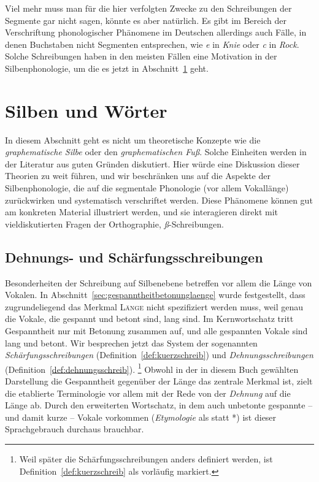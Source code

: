 Viel mehr muss man für die hier verfolgten Zwecke zu den Schreibungen der Segmente gar nicht sagen, könnte es aber natürlich.
Es gibt im Bereich der Verschriftung phonologischer Phänomene im Deutschen allerdings auch Fälle, in denen Buchstaben nicht Segmenten entsprechen, wie \textit{e} in \textit{Knie} oder \textit{c} in \textit{Rock}.
Solche Schreibungen haben in den meisten Fällen eine Motivation in der Silbenphonologie, um die es jetzt in Abschnitt~\ref{sec:silbenschreib} geht.

\section{Silben und Wörter}

\label{sec:silbenschreib}

In diesem Abschnitt geht es nicht um theoretische Konzepte wie die \textit{graphematische Silbe} oder den \textit{graphematischen Fuß}.
Solche Einheiten werden in der Literatur aus guten Gründen diskutiert.
Hier würde eine Diskussion dieser Theorien zu weit führen, und wir beschränken uns auf die Aspekte der Silbenphonologie, die auf die segmentale Phonologie (vor allem Vokallänge) zurückwirken und systematisch verschriftet werden.
Diese Phänomene können gut am konkreten Material illustriert werden, und sie interagieren direkt mit vieldiskutierten Fragen der Orthographie, \zB \textit{ß}-Schreibungen.

\subsection{Dehnungs- und Schärfungsschreibungen}

\label{sec:laengeschreib}

Besonderheiten der Schreibung auf Silbenebene betreffen vor allem die Länge von Vokalen.
In Abschnitt~\ref{sec:gespanntheitbetonunglaenge} wurde festgestellt, dass zugrundeliegend das Merkmal \textsc{Länge} nicht spezifiziert werden muss, weil genau die Vokale, die gespannt und betont sind, lang sind.
Im Kernwortschatz tritt Gespanntheit nur mit Betonung zusammen auf, und alle gespannten Vokale sind lang und betont.
Wir besprechen jetzt das System der sogenannten \textit{Schärfungsschreibungen} (Definition~\ref{def:kuerzschreib}) und \textit{Dehnungsschreibungen} (Definition~\ref{def:dehnungsschreib}).%
\footnote{Weil später die Schärfungsschreibungen anders definiert werden, ist Definition~\ref{def:kuerzschreib} als vorläufig markiert.}
Obwohl in der in diesem Buch gewählten Darstellung die Gespanntheit gegenüber der Länge das zentrale Merkmal ist, zielt die etablierte Terminologie vor allem mit der Rede von der \textit{Dehnung} auf die Länge ab.
Durch den erweiterten Wortschatz, in dem auch unbetonte gespannte -- und damit kurze -- Vokale vorkommen (\zB \textit{Etymologie} als \textipa{[Petymologi:]} statt *\textipa{[PEtYmOlOgi:]}) ist dieser Sprachgebrauch durchaus brauchbar.

